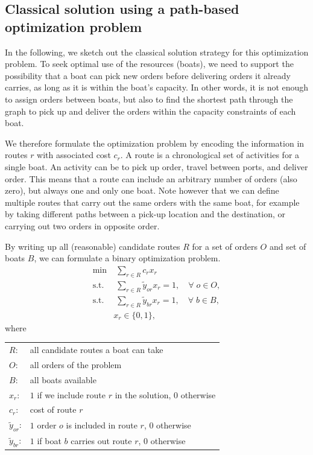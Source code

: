\documentclass{article}
\begin{document}
\subsection{Classical solution using a path-based optimization problem}
In the following, we sketch out the classical solution strategy for this optimization problem. To seek optimal use of the resources (boats), we need to support the possibility that a boat can pick new orders before delivering orders it already carries, as long as it is within the boat's capacity. In other words, it is not enough to assign orders between boats, but also to find the shortest path through the graph to pick up and deliver the orders within the capacity constraints of each boat.

We therefore formulate the optimization problem by encoding the information in routes $r$ with associated cost $c_r$. A route is a chronological set of activities for a single boat. An activity can  be to pick up order, travel between ports, and deliver order. This means that a route can include an arbitrary number of orders (also zero), but always one and only one boat. Note however that we can define multiple routes that carry out the same orders with the same boat, for example by taking different paths between a pick-up location and the destination, or carrying out two orders in opposite order.

By writing up all (reasonable) candidate routes $R$ for a set of orders $O$ and set of boats $B$, we can formulate a binary optimization problem. 
\begin{subequations}
    \begin{align}
      \text{min} &\; \sum_{r \in R} c_r x_r \label{eq:path-1}\\
      \text{s.t.}& \; \sum_{r \in R} \tilde{y}_{or} x_r = 1, \hspace{1em} \forall \; o \in O, \label{eq:path-order} \\
      \text{s.t.}& \; \sum_{r \in R} \tilde{y}_{br} x_r = 1, \hspace{1em} \forall \; b \in B, \label{eq:path-boat} \\
       &x_r \in \{0, 1\}, \label{eq:path-3}
    \end{align}
    \label{eq:path}
\end{subequations}
where
\vspace{1em}

\begin{tabular}[c]{ll}
  $R$: & all candidate routes a boat can take \\
  $O$: & all orders of the problem \\
  $B$: & all boats available \\
  $x_r$: & $1$ if we include route $r$ in the solution, $0$ otherwise \\
  $c_r$: & cost of route $r$ \\
  $\tilde{y}_{or}$: & $1$ order $o$ is included in route $r$, $0$ otherwise \\
  $\tilde{y}_{br}$: & $1$ if boat $b$ carries out route $r$, $0$ otherwise \\
\end{tabular}
\vspace{1em}
\end{document}
